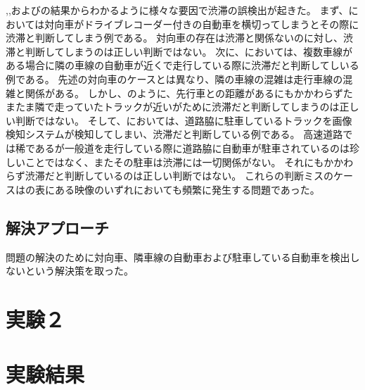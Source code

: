 ,,およびの結果からわかるように様々な要因で渋滞の誤検出が起きた。
まず、においては対向車がドライブレコーダー付きの自動車を横切ってしまうとその際に渋滞と判断してしまう例である。
対向車の存在は渋滞と関係ないのに対し、渋滞と判断してしまうのは正しい判断ではない。
次に、においては、複数車線がある場合に隣の車線の自動車が近くで走行している際に渋滞だと判断してしいる例である。
先述の対向車のケースとは異なり、隣の車線の混雑は走行車線の混雑と関係がある。
しかし、のように、先行車との距離があるにもかかわらずたまたま隣で走っていたトラックが近いがために渋滞だと判断してしまうのは正しい判断ではない。
そして、においては、道路脇に駐車しているトラックを画像検知システムが検知してしまい、渋滞だと判断している例である。
高速道路では稀であるが一般道を走行している際に道路脇に自動車が駐車されているのは珍しいことではなく、またその駐車は渋滞には一切関係がない。
それにもかかわらず渋滞だと判断しているのは正しい判断ではない。
これらの判断ミスのケースはの表にある映像のいずれにおいても頻繁に発生する問題であった。

\subsection{解決アプローチ}
問題の解決のために対向車、隣車線の自動車および駐車している自動車を検出しないという解決策を取った。


\section{実験２}

\section{実験結果}


